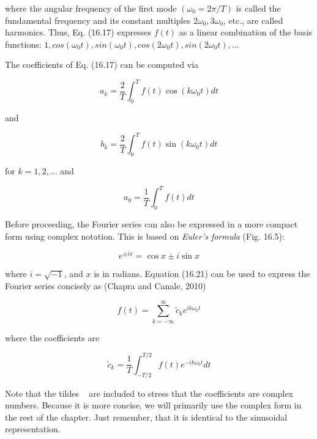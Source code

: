 \documentclass[../main.tex]{subfiles}
\begin{document}
\noindent where the angular frequency of the first mode $(\omega_0 = 2 \pi /T)$ is called the fundamental
frequency and its constant multiples $2 \omega_0, 3 \omega_0$, etc., are called harmonics. Thus, Eq. (16.17)
expresses $f(t)$ as a linear combination of the basis functions: $1, cos( \omega_0 t), sin(\omega_0 t), cos(2 \omega_0 t),
sin(2 \omega_0 t), \dots$

The coefficients of Eq. (16.17) can be computed via

\begin{equation}
	\tag{16.18}
	a_k = \frac{2}{T} \int ^ T _ 0 f(t) \cos (k \omega_0 t) dt
\end{equation}

\noindent and

\begin{equation}
	\tag{16.19}
	b_k = \frac{2}{T} \int ^ T _ 0 f(t) \sin (k \omega_0 t) dt
\end{equation}

\noindent for $k = 1, 2, \dots$ and

\begin{equation}
	\tag{16.20}
	a_0 = \frac{1}{T} \int ^ T _ 0 f(t)dt
\end{equation}


Before proceeding, the Fourier series can also be expressed in a more compact form
using complex notation. This is based on \textit{Euler's formula} (Fig. 16.5):

\begin{equation}
	\tag{16.21}
	e^{\pm ix} = \cos x \pm  i \sin x
\end{equation}

\noindent where $i = \sqrt{-1}$, and $x$ is in radians. Equation (16.21) can be used to express the Fourier
series concisely as (Chapra and Canale, 2010)

\begin{equation}
	\tag{16.22}
	f(t) = \sum _ {k=-\infty} ^ {\infty} \tilde{c}_k e^{i k \omega_0 t} 
\end{equation}

\noindent where the coefficients are

\begin{equation}
	\tag{16.23}
	\tilde{c}_k = \frac{1}{T} \int ^ {T/2} _ {-T/2} f(t) e ^ {-ik \omega_0 t} dt
\end{equation}

Note that the tildes ~ are included to stress that the coefficients are complex numbers.
Because it is more concise, we will primarily use the complex form in the rest of the
chapter. Just remember, that it is identical to the sinusoidal representation.
\end{document}
